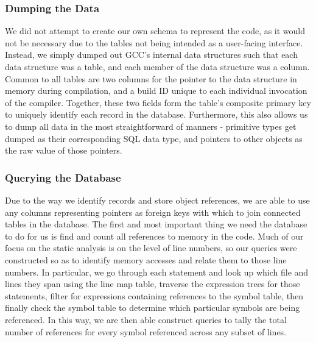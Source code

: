 \subsubsection{Dumping the Data}
We did not attempt to create our own schema to represent the code, as it would not be necessary due to the tables not being intended as a user-facing interface.
Instead, we simply dumped out \ac{GCC}'s internal data structures such that each data structure was a table, and each member of the data structure was a column.
Common to all tables are two columns for the pointer to the data structure in memory during compilation, and a build ID unique to each individual invocation of the compiler.
Together, these two fields form the table's composite primary key to uniquely identify each record in the database.
Furthermore, this also allows us to dump all data in the most straightforward of manners - primitive types get dumped as their corresponding \acs{SQL} data type, and pointers to other objects as the raw value of those pointers.
\subsubsection{Querying the Database}
Due to the way we identify records and store object references, we are able to use any columns representing pointers as foreign keys with which to join connected tables in the database.
The first and most important thing we need the database to do for us is find and count all references to memory in the code.
Much of our focus on the static analysis is on the level of line numbers, so our queries were constructed so as to identify memory accesses and relate them to those line numbers.
In particular, we go through each statement and look up which file and lines they span using the line map table, traverse the expression trees for those statements, filter for expressions containing references to the symbol table, then finally check the symbol table to determine which particular symbols are being referenced.
In this way, we are then able construct queries to tally the total number of references for every symbol referenced across any subset of lines.
